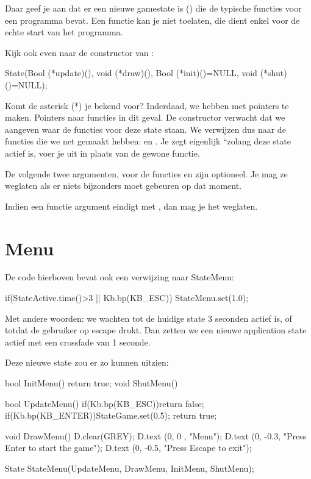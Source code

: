 Daar geef je aan dat er een nieuwe gamestate is () die de typische functies voor een programma bevat. Een  functie kan je niet toelaten, die dient enkel voor de echte start van het programma.

Kijk ook even naar de constructor van :

\begin{code}
State(Bool (*update)(), void (*draw)(), Bool (*init)()=NULL, void (*shut)()=NULL); 
\end{code}

Komt de asterisk (*) je bekend voor? Inderdaad, we hebben met pointers te maken. Pointers naar functies in dit geval. De constructor verwacht dat we aangeven waar de functies voor deze state staan. We verwijzen dus naar de functies die we net gemaakt hebben:  en . Je zegt eigenlijk ``zolang deze state actief is, voer je  uit in plaats van de gewone  functie.

De volgende twee argumenten, voor de functies  en  zijn optioneel. Je mag ze weglaten als er niets bijzonders moet gebeuren op dat moment.

\begin{note}
Indien een functie argument eindigt met , dan mag je het weglaten.
\end{note} 

\section{Menu}
De code hierboven bevat ook een verwijzing naar StateMenu:

\begin{code}
   if(StateActive.time()>3 || Kb.bp(KB_ESC)) {
      StateMenu.set(1.0);                    
   }
\end{code}

Met andere woorden: we wachten tot de huidige state 3 seconden actief is, of totdat de gebruiker op escape drukt. Dan zetten we een nieuwe application state actief met een crossfade van 1 seconde.

Deze nieuwe state zou er zo kunnen uitzien:
\begin{code}
bool InitMenu() {return true;}
void ShutMenu() {}

bool UpdateMenu()
{
   if(Kb.bp(KB_ESC))return false;
   if(Kb.bp(KB_ENTER))StateGame.set(0.5);
   return true;
}

void DrawMenu()
{
   D.clear(GREY);
   D.text (0,  0  , "Menu");
   D.text (0, -0.3, "Press Enter to start the game");
   D.text (0, -0.5, "Press Escape to exit");
}

State StateMenu(UpdateMenu, DrawMenu, InitMenu, ShutMenu);
\end{code}

